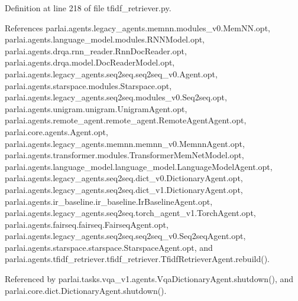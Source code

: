 Definition at line 218 of file tfidf\+\_\+retriever.\+py.



References parlai.\+agents.\+legacy\+\_\+agents.\+memnn.\+modules\+\_\+v0.\+Mem\+N\+N.\+opt, parlai.\+agents.\+language\+\_\+model.\+modules.\+R\+N\+N\+Model.\+opt, parlai.\+agents.\+drqa.\+rnn\+\_\+reader.\+Rnn\+Doc\+Reader.\+opt, parlai.\+agents.\+drqa.\+model.\+Doc\+Reader\+Model.\+opt, parlai.\+agents.\+legacy\+\_\+agents.\+seq2seq.\+seq2seq\+\_\+v0.\+Agent.\+opt, parlai.\+agents.\+starspace.\+modules.\+Starspace.\+opt, parlai.\+agents.\+legacy\+\_\+agents.\+seq2seq.\+modules\+\_\+v0.\+Seq2seq.\+opt, parlai.\+agents.\+unigram.\+unigram.\+Unigram\+Agent.\+opt, parlai.\+agents.\+remote\+\_\+agent.\+remote\+\_\+agent.\+Remote\+Agent\+Agent.\+opt, parlai.\+core.\+agents.\+Agent.\+opt, parlai.\+agents.\+legacy\+\_\+agents.\+memnn.\+memnn\+\_\+v0.\+Memnn\+Agent.\+opt, parlai.\+agents.\+transformer.\+modules.\+Transformer\+Mem\+Net\+Model.\+opt, parlai.\+agents.\+language\+\_\+model.\+language\+\_\+model.\+Language\+Model\+Agent.\+opt, parlai.\+agents.\+legacy\+\_\+agents.\+seq2seq.\+dict\+\_\+v0.\+Dictionary\+Agent.\+opt, parlai.\+agents.\+legacy\+\_\+agents.\+seq2seq.\+dict\+\_\+v1.\+Dictionary\+Agent.\+opt, parlai.\+agents.\+ir\+\_\+baseline.\+ir\+\_\+baseline.\+Ir\+Baseline\+Agent.\+opt, parlai.\+agents.\+legacy\+\_\+agents.\+seq2seq.\+torch\+\_\+agent\+\_\+v1.\+Torch\+Agent.\+opt, parlai.\+agents.\+fairseq.\+fairseq.\+Fairseq\+Agent.\+opt, parlai.\+agents.\+legacy\+\_\+agents.\+seq2seq.\+seq2seq\+\_\+v0.\+Seq2seq\+Agent.\+opt, parlai.\+agents.\+starspace.\+starspace.\+Starspace\+Agent.\+opt, and parlai.\+agents.\+tfidf\+\_\+retriever.\+tfidf\+\_\+retriever.\+Tfidf\+Retriever\+Agent.\+rebuild().



Referenced by parlai.\+tasks.\+vqa\+\_\+v1.\+agents.\+Vqa\+Dictionary\+Agent.\+shutdown(), and parlai.\+core.\+dict.\+Dictionary\+Agent.\+shutdown().

